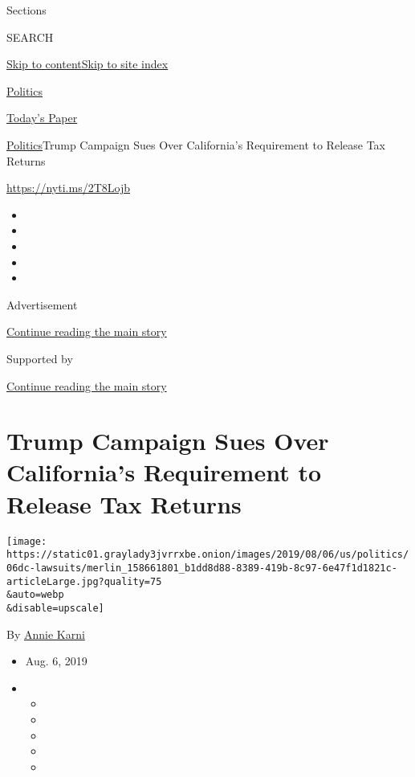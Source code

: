 Sections

SEARCH

\protect\hyperlink{site-content}{Skip to
content}\protect\hyperlink{site-index}{Skip to site index}

\href{https://www.nytimes3xbfgragh.onion/section/politics}{Politics}

\href{https://myaccount.nytimes3xbfgragh.onion/auth/login?response_type=cookie\&client_id=vi}{}

\href{https://www.nytimes3xbfgragh.onion/section/todayspaper}{Today's
Paper}

\href{/section/politics}{Politics}\textbar{}Trump Campaign Sues Over
California's Requirement to Release Tax Returns

\url{https://nyti.ms/2T8Lojb}

\begin{itemize}
\item
\item
\item
\item
\item
\end{itemize}

Advertisement

\protect\hyperlink{after-top}{Continue reading the main story}

Supported by

\protect\hyperlink{after-sponsor}{Continue reading the main story}

\hypertarget{trump-campaign-sues-over-californias-requirement-to-release-tax-returns}{%
\section{Trump Campaign Sues Over California's Requirement to Release
Tax
Returns}\label{trump-campaign-sues-over-californias-requirement-to-release-tax-returns}}

\texttt{[image: https://static01.graylady3jvrrxbe.onion/images/2019/08/06/us/politics/06dc-lawsuits/merlin\_158661801\_b1dd8d88-8389-419b-8c97-6e47f1d1821c-articleLarge.jpg?quality=75\\\&auto=webp\\\&disable=upscale]}

By \href{https://www.nytimes3xbfgragh.onion/by/annie-karni}{Annie Karni}

\begin{itemize}
\item
  Aug. 6, 2019
\item
  \begin{itemize}
  \item
  \item
  \item
  \item
  \item
  \end{itemize}
\end{itemize}

